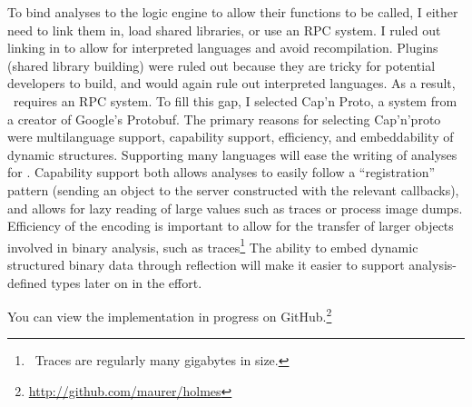 To bind analyses to the logic engine to allow their functions to be called, I either need to link them in, load shared libraries, or use an RPC system.
I ruled out linking in to allow for interpreted languages and avoid recompilation.
Plugins (shared library building) were ruled out because they are tricky for potential developers to build, and would again rule out interpreted languages.
As a result, \sysname\ requires an RPC system.
To fill this gap, I selected Cap'n Proto\cite{capnproto}, a system from a creator of Google's Protobuf\cite{protobuf}.
The primary reasons for selecting Cap'n'proto were multilanguage support, capability support, efficiency, and embeddability of dynamic structures.
Supporting many languages will ease the writing of analyses for \sysname.
Capability support both allows analyses to easily follow a ``registration'' pattern (sending an object to the server constructed with the relevant callbacks), and allows for lazy reading of large values such as traces or process image dumps.
Efficiency of the encoding is important to allow for the transfer of larger objects involved in binary analysis, such as traces\footnote{\
Traces are regularly many gigabytes in size.
}
The ability to embed dynamic structured binary data through reflection will make it easier to support analysis-defined types later on in the effort.

You can view the implementation in progress on GitHub.\footnote{\url{http://github.com/maurer/holmes}}
